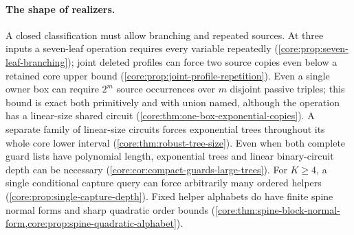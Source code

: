 \paragraph{The shape of realizers.}
A closed classification must allow branching and repeated sources.
At three inputs a seven-leaf operation requires every variable repeatedly
(\cref{core:prop:seven-leaf-branching}); joint deleted profiles can force
two source copies even below a retained core upper bound
(\cref{core:prop:joint-profile-repetition}). Even a single owner box
can require $2^m$ source occurrences over $m$ disjoint passive triples;
this bound is exact both primitively and with union named, although the
operation has a linear-size shared circuit
(\cref{core:thm:one-box-exponential-copies}). A separate family of
linear-size circuits forces exponential trees throughout its whole
core lower interval
(\cref{core:thm:robust-tree-size}). Even when both complete guard lists have
polynomial length, exponential trees and linear binary-circuit depth
can be necessary (\cref{core:cor:compact-guards-large-trees}). For $K\geq4$, a single conditional
capture query can force arbitrarily many ordered helpers
(\cref{core:prop:single-capture-depth}). Fixed helper alphabets do have
finite spine normal forms and sharp quadratic order bounds
(\cref{core:thm:spine-block-normal-form,core:prop:spine-quadratic-alphabet}).


